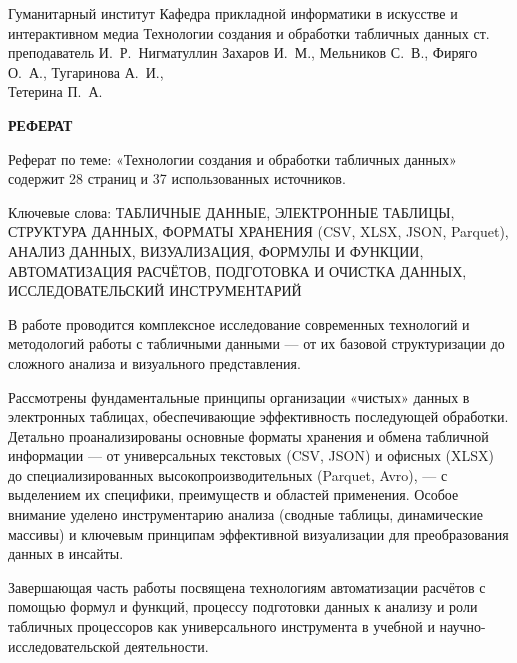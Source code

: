 \documentclass{SibFU-docs}
\begin{document}
\renewcommand{\contentsname}{}
\mycovertitle
{Гуманитарный институт}
{Кафедра прикладной информатики в искусстве и интерактивном медиа}
{Технологии создания и обработки табличных данных}
{ст. преподаватель И.~Р.~Нигматуллин}
{Захаров И.~М., Мельников С.~В., Фиряго О.~А., Тугаринова А.~И.,\\
Тетерина П.~А.}
 
\begin{center}
\bfseries РЕФЕРАТ
\end{center}
\noindent

Реферат по теме: «Технологии создания и обработки табличных данных» содержит 28 страниц и 37 использованных источников.

Ключевые слова: ТАБЛИЧНЫЕ ДАННЫЕ, ЭЛЕКТРОННЫЕ ТАБЛИЦЫ, СТРУКТУРА ДАННЫХ, ФОРМАТЫ ХРАНЕНИЯ (CSV, XLSX, JSON, Parquet), АНАЛИЗ ДАННЫХ, ВИЗУАЛИЗАЦИЯ, ФОРМУЛЫ И ФУНКЦИИ, АВТОМАТИЗАЦИЯ РАСЧЁТОВ, ПОДГОТОВКА И ОЧИСТКА ДАННЫХ, ИССЛЕДОВАТЕЛЬСКИЙ ИНСТРУМЕНТАРИЙ

В работе проводится комплексное исследование современных технологий и методологий работы с табличными данными — от их базовой структуризации до сложного анализа и визуального представления.

Рассмотрены фундаментальные принципы организации «чистых» данных в электронных таблицах, обеспечивающие эффективность последующей обработки. Детально проанализированы основные форматы хранения и обмена табличной информации — от универсальных текстовых (CSV, JSON) и офисных (XLSX) до специализированных высокопроизводительных (Parquet, Avro), — с выделением их специфики, преимуществ и областей применения. Особое внимание уделено инструментарию анализа (сводные таблицы, динамические массивы) и ключевым принципам эффективной визуализации для преобразования данных в инсайты.

Завершающая часть работы посвящена технологиям автоматизации расчётов с помощью формул и функций, процессу подготовки данных к анализу и роли табличных процессоров как универсального инструмента в учебной и научно-исследовательской деятельности.
\end{document}
